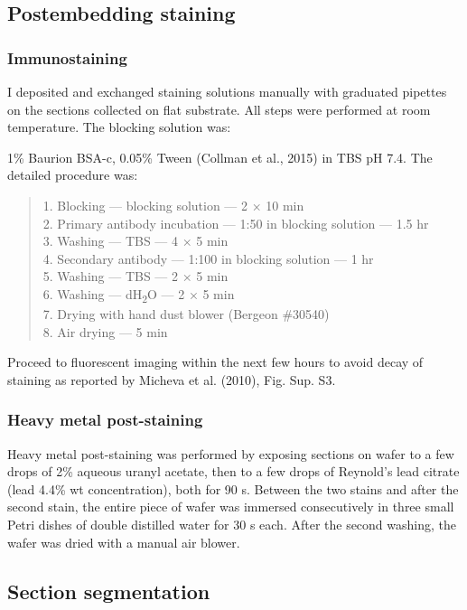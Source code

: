 \documentclass{article}
\begin{document}
\subsection*{Postembedding staining}

\subsubsection*{Immunostaining}

I deposited and exchanged staining solutions manually with graduated pipettes on the sections collected on flat substrate. All steps were performed at room temperature. The blocking solution was:

1\% Baurion BSA-c, 0.05\% Tween (Collman et al., 2015) in TBS pH 7.4. The detailed procedure was:

\begin{quote}
1. Blocking — blocking solution — 2 × 10 min\\
2. Primary antibody incubation — 1:50 in blocking solution — 1.5 hr\\
3. Washing — TBS — 4 × 5 min\\
4. Secondary antibody — 1:100 in blocking solution — 1 hr\\
5. Washing — TBS — 2 × 5 min\\
6. Washing — dH\textsubscript{2}O — 2 × 5 min\\
7. Drying with hand dust blower (Bergeon \#30540)\\
8. Air drying — 5 min
\end{quote}

Proceed to fluorescent imaging within the next few hours to avoid decay of staining as reported by Micheva et al. (2010), Fig. Sup. S3.

\subsubsection*{Heavy metal post-staining}

Heavy metal post-staining was performed by exposing sections on wafer to a few drops of 2\% aqueous uranyl acetate, then to a few drops of Reynold’s lead citrate (lead 4.4\% wt concentration), both for 90 s. Between the two stains and after the second stain, the entire piece of wafer was immersed consecutively in three small Petri dishes of double distilled water for 30 s each. After the second washing, the wafer was dried with a manual air blower.

\subsection*{Section segmentation}
\end{document}
